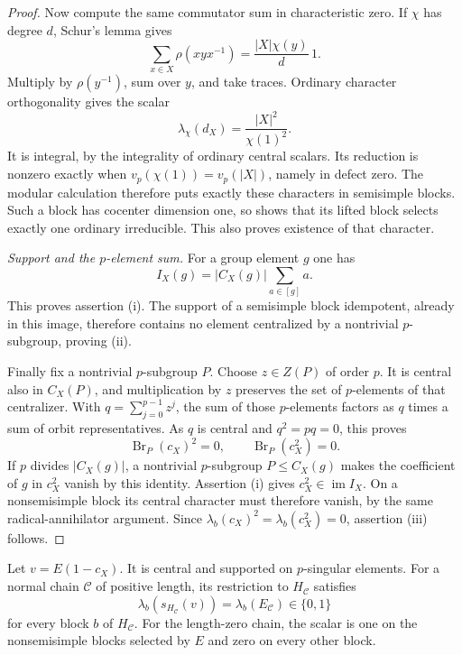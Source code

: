 \begin{proof}
Now compute the same commutator sum in characteristic zero. If
$\chi$ has degree $d$, Schur's lemma gives
\[
 \sum_{x\in X}\rho(xyx^{-1})
      =\frac{|X|\chi(y)}d\,1.
\]
Multiply by $\rho(y^{-1})$, sum over $y$, and take traces.
Ordinary character orthogonality gives the scalar
\begin{equation}\label{eq:ordinary-commutator-scalar}
 \lambda_\chi(d_X)=\frac{|X|^2}{\chi(1)^2}.
\end{equation}
It is integral, by the integrality of ordinary central scalars.
Its reduction is nonzero exactly when
$v_p(\chi(1))=v_p(|X|)$, namely in defect zero. The modular
calculation therefore puts exactly these characters in
semisimple blocks. Such a block has cocenter dimension one, so
 shows that its lifted block selects
exactly one ordinary irreducible. This also proves existence of
that character.

\textit{Support and the $p$-element sum.}
For a group element $g$ one has
\[
 I_X(g)=|C_X(g)|\sum_{a\in[g]}a.
\]
This proves assertion (i). The support of a semisimple block
idempotent, already in this image, therefore contains no element
centralized by a nontrivial $p$-subgroup, proving (ii).

Finally fix a nontrivial $p$-subgroup $P$. Choose
$z\in Z(P)$ of order $p$. It is central also in $C_X(P)$, and
multiplication by $z$ preserves the set of $p$-elements of that
centralizer. With $q=\sum_{j=0}^{p-1}z^j$, the sum of those
$p$-elements factors as $q$ times a sum of orbit representatives.
As $q$ is central and $q^2=pq=0$, this proves
\[
 \operatorname{Br}_P(c_X)^2=0,
 \qquad \operatorname{Br}_P(c_X^2)=0.
\]
If $p$ divides $|C_X(g)|$, a nontrivial $p$-subgroup
$P\leq C_X(g)$ makes the coefficient of $g$ in $c_X^2$ vanish
by this identity. Assertion (i) gives $c_X^2\in\operatorname{im}I_X$.
On a nonsemisimple block its central character must therefore
vanish, by the same radical-annihilator argument. Since
$\lambda_b(c_X)^2=\lambda_b(c_X^2)=0$, assertion (iii) follows.
\end{proof}

\begin{lemma}
\label{lem:detecting-element}
Let $v=E(1-c_X)$. It is central and supported on $p$-singular
elements. For a normal chain $\mathcal C$ of positive length, its
restriction to $H_{\mathcal C}$ satisfies
\[
 \lambda_b(s_{H_{\mathcal C}}(v))=\lambda_b(E_{\mathcal C})
 \in\{0,1\}
\]
for every block $b$ of $H_{\mathcal C}$. For the length-zero
chain, the scalar is one on the nonsemisimple blocks selected by
$E$ and zero on every other block.
\end{lemma}


